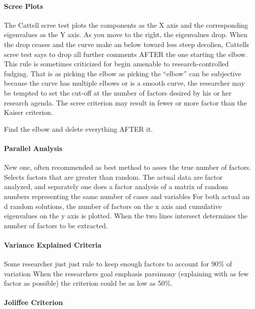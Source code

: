 \documentclass[]{book}
\let\oldparagraph\paragraph
\renewcommand{\paragraph}[1]{\oldparagraph{#1}\mbox{}}
\theoremstyle{definition}
\theoremstyle{definition}
\theoremstyle{definition}
\theoremstyle{remark}
\begin{document}
\paragraph{Scree Plots}\label{scree-plots}

The Cattell scree test plots the components as the X axis and the
corresponding eigenvalues as the Y axis. As you move to the right, the
eigenvalues drop. When the drop ceases and the curve make an below
toward less steep decolien, Cattells scree test says to drop all further
comments AFTER the one starting the elbow. This rule is sometimes
criticized for begin amenable to research-controlled fudging. That is as
picking the elbow as picking the ``elbow'' can be subjective because the
curve has multiple elbows or is a smooth curve, the researcher may be
tempted to set the cut-off at the number of factors desired by his or
her research agenda. The scree criterion may result in fewer or more
factor than the Kaiser criterion.

Find the elbow and delete everything AFTER it.

\paragraph{Parallel Analysis}\label{parallel-analysis}

New one, often recommended as best method to asses the true number of
factors. Selects factors that are greater than random. The actual data
are factor analyzed, and separately one does a factor analysis of a
matrix of random numbers representing the same number of cases and
variables For both actual an d random solutions, the number of factors
on the x axis and cumulative eigenvalues on the y axis is plotted. When
the two lines intersect determines the number of factors to be
extracted.

\paragraph{Variance Explained
Criteria}\label{variance-explained-criteria}

Some researcher just just rule to keep enough factors to account for
90\% of variation When the researchers goal emphasis parsimony
(explaining with as few factor as possible) the criterion could be as
low as 50\%.

\paragraph{Joliffee Criterion}\label{joliffee-criterion}
\end{document}
